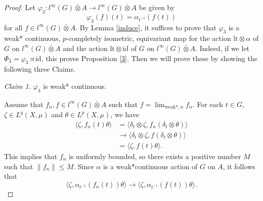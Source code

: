 \documentclass[10pt,a4paper]{amsart}
\newcommand{\la}{\langle}
\newcommand{\ra}{\rangle}
\begin{document}
\begin{proof}
Let $\varphi_3:l^\infty(G)\bar{\otimes}A\rightarrow l^\infty(G)\bar{\otimes}A$ be given by $$\varphi_3(f)(t)=\alpha_{t^{-1}}(f(t))$$ for all $f\in l^\infty(G)\bar{\otimes}A$. By Lemma \ref{induce}, it suffices to prove that $\varphi_3$ is a weak* continuous, $p$-completely isometric, equivariant map for the action $\mathrm{lt}\otimes\alpha$ of $G$ on $l^\infty(G)\bar{\otimes}A$ and the action $\mathrm{lt}\otimes\mathrm{id}$ of $G$ on $l^\infty(G)\bar{\otimes}A$.
Indeed, if we let $\Phi_3=\varphi_3\rtimes\mathrm{id}$, this proves Proposition \ref{3}.
Then we will prove these by showing the following three Claims.

{\it Claim 1.} $\varphi_3$ is weak* continuous.

Assume that $f_n,f\in l^\infty(G)\bar{\otimes}A$ such that $f=\lim_{\mathrm{weak}*,n}f_n$. For each $t\in G$, $\zeta\in L^q(X,\mu)$ and $\theta\in L^p(X,\mu)$, we have
$$\begin{aligned} \la \zeta, f_n(t)\theta\ra
 &=\la \delta_t\otimes \zeta, f_n(\delta_t\otimes\theta)\ra \\
 &\rightarrow \la \delta_t\otimes \zeta, f(\delta_t\otimes\theta)\ra\\
 &=\la \zeta,f(t)\theta\ra. \end{aligned}$$
This implies that $f_n$ is uniformly bounded, so there exists a positive number $M$ such that $\|f_n\|\leq M.$
Since $\alpha$ is a weak*continuous action of $G$ on $A$, it follows that $$\la\zeta,\alpha_{t^{-1}}(f_n(t))\theta\ra\rightarrow \la\zeta,\alpha_{t^{-1}}(f(t))\theta\ra.$$


\end{proof}
\end{document}
